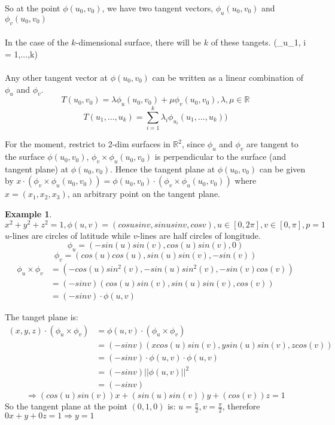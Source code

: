 \documentclass[12pt]{article}
\theoremstyle{plain}
\theoremstyle{definition}
\newtheorem{example}[theorem]{Example}
\begin{document}
So at the point $\phi (u_0, v_0)$, we have two tangent vectors, $\phi_u (u_0, v_0)$ and $\phi_v (u_0, v_0)$\\
\\
In the case of the $k$-dimensional surface, there will be $k$ of these tangets. (\phi_{u_1}, i = 1,...,k)\\
\\
Any other tangent vector at $\phi (u_0, v_0)$ can be written as a linear combination of $\phi_u$ and $\phi_v$.
$$T(u_0, v_0) = \lambda \phi_u (u_0, v_0) + \mu \phi_v (u_0, v_0), \lambda, \mu \in \mathbb{R}$$
$$T(u_1, ..., u_k) = \sum^k_{i=1} \lambda_i \phi_{u_i} (u_1, ..., u_k))$$

For the moment, restrict to 2-dim surfaces in $\mathbb{R}^2$, since $\phi_u$ and $\phi_v$ are tangent to the surface $\phi (u_0, v_0)$, $\phi_v \times \phi_u (u_0, v_0)$ is perpendicular to the surface (and tangent plane) at $\phi (u_0, v_0)$. Hence the tangent plane at $\phi (u_0, v_0)$ can be given by $x\cdot (\phi_v \times \phi_u (u_0, v_0)) = \phi (u_0, v_0) \cdot (\phi_v \times \phi_u (u_0, v_0))$ where $x=(x_1, x_2, x_3)$, an arbitrary point on the tangent plane.

\begin{example}
	$x^2 + y^2 + z^2 = 1, \phi (u,v) = (cosu sinv, sinu sinv, cosv), u\in [0,2\pi], v\in [0,\pi], p=1$\\
	$u$-lines are circles of latitude while $v$-lines are half circles of longitude.\\
	$$\phi_u = (-sin(u)sin(v), cos(u)sin(v), 0)$$
	$$\phi_v = (cos(u)cos(u), sin(u)sin(v), -sin(v))$$
	\begin{align*}
		\phi_u \times \phi_v &= (-cos(u)sin^2(v), -sin(u)sin^2 (v), -sin(v)cos(v))\\
		&= (-sinv)(cos(u)sin(v), sin(u)sin(v), cos(v))\\
		&= (-sinv)\cdot \phi (u,v)
	\end{align*}

	The tanget plane is:
	\begin{align*}
		(x,y,z)\cdot (\phi_u \times \phi_v) &= \phi (u,v) \cdot (\phi_u \times \phi_v)\\
		&= (-sinv)(xcos(u)sin(v), ysin(u)sin(v), zcos(v))\\
		&= (-sinv) \cdot  \phi (u,v) \cdot  \phi (u,v)\\
		&= (-sinv) || \phi (u,v) ||^2\\
		&= (-sinv)
	\end{align*}
	$$\Longrightarrow (cos(u)sin(v))x + (sin(u)sin(v))y + (cos(v))z = 1$$
	So the tangent plane at the point $(0,1,0)$ is:
	$u=\frac{\pi}{2}, v=\frac{\pi}{2}$, therefore $0x + y + 0z = 1 \Longrightarrow y=1$

\end{example}
\end{document}
